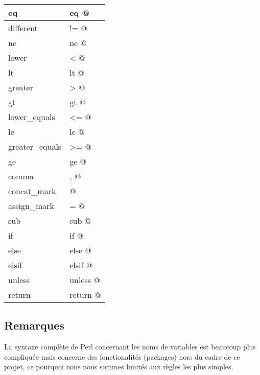 \documentclass[a4paper,10pt]{article}
\begin{document}
\begin{center}
\begin{tabular}{ | l | l |}
		    	\hline eq & \verb@ eq @ \\
		    	\hline different & \verb@ != @ \\
		    	\hline ne & \verb@ ne @ \\
		    	\hline lower & \verb@ < @ \\
		    	\hline lt & \verb@ lt @ \\
		    	\hline greater & \verb@ > @ \\
		    	\hline gt & \verb@ gt @ \\
		    	\hline lower\_equals & \verb@ <= @ \\
		    	\hline le & \verb@ le @ \\
		    	\hline greater\_equals & \verb@ >= @ \\
		    	\hline ge & \verb@ ge @ \\
		    	\hline comma & \verb@ , @ \\
		    	\hline concat\_mark & \verb@ \. @ \\
		    	\hline assign\_mark & \verb@ = @ \\
		    	\hline sub & \verb@ sub @ \\
		    	\hline if & \verb@ if @ \\
		    	\hline else & \verb@ else @ \\
		    	\hline elsif & \verb@ elsif @ \\
		    	\hline unless & \verb@ unless @ \\
		    	\hline return & \verb@ return @ \\
		    	\hline
		    \end{tabular}
		\end{center}
		
		
	
	\subsection{Remarques}
		La syntaxe complète de Perl concernant les noms de variables est beaucoup plus
		compliquée mais concerne des fonctionalités (packages) hors du cadre de ce
		projet, ce pourquoi nous nous sommes limités aux règles les plus simples.
	
\end{document}
